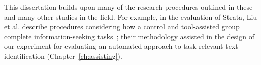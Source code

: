 This dissertation builds upon many of the research procedures outlined 
in these and many other studies in the field. 
For example, in the evaluation of Strata, 
 Liu et al. describe procedures 
considering how a control and tool-assisted group 
complete information-seeking tasks~\cite{liu2021};
their methodology assisted in the design of our experiment for 
evaluating an automated approach to
task-relevant text identification (Chapter~\ref{ch:assisting}).
